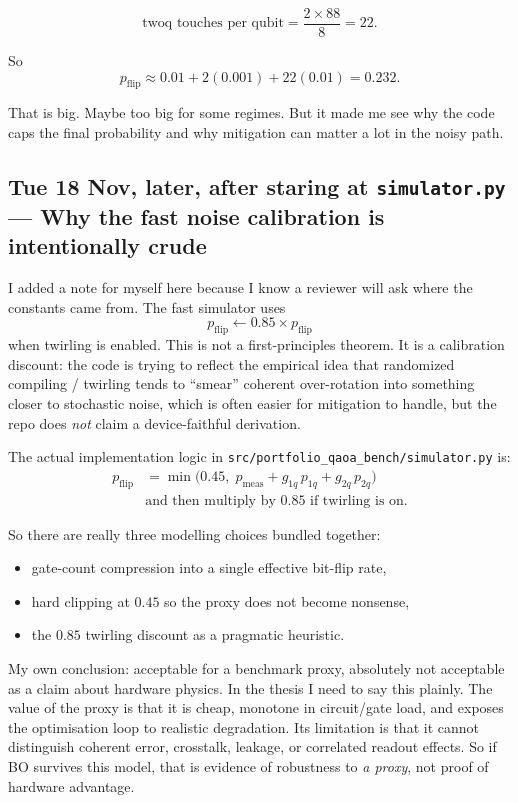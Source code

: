 \documentclass[11pt]{article}
\newcommand{\entry}[2]{\subsection*{#1 --- #2}}
\newcommand{\repo}[1]{\texttt{#1}}
\begin{document}
\[
\text{twoq touches per qubit}
=
\frac{2 \times 88}{8} = 22.
\]

So
\[
p_{\text{flip}} \approx 0.01 + 2(0.001) + 22(0.01) = 0.232.
\]

That is big. Maybe too big for some regimes. But it made me see why the code caps the final
probability and why mitigation can matter a lot in the noisy path.

\entry{Tue 18 Nov, later, after staring at \repo{simulator.py}}{Why the fast noise calibration is intentionally crude}

I added a note for myself here because I know a reviewer will ask where the constants came from.
The fast simulator uses
\[
p_{\text{flip}} \leftarrow 0.85 \times p_{\text{flip}}
\]
when twirling is enabled. This is not a first-principles theorem. It is a calibration discount:
the code is trying to reflect the empirical idea that randomized compiling / twirling tends to
``smear'' coherent over-rotation into something closer to stochastic noise, which is often easier
for mitigation to handle, but the repo does \emph{not} claim a device-faithful derivation.

The actual implementation logic in \repo{src/portfolio\_qaoa\_bench/simulator.py} is:
\begin{align*}
p_{\text{flip}}
&=
\min\Big(
0.45,\;
p_{\text{meas}}
+ g_{1q}\,p_{1q}
+ g_{2q}\,p_{2q}
\Big) \\
&\text{and then multiply by }0.85\text{ if twirling is on.}
\end{align*}

So there are really three modelling choices bundled together:
\begin{itemize}[leftmargin=1.4em]
\item gate-count compression into a single effective bit-flip rate,
\item hard clipping at \(0.45\) so the proxy does not become nonsense,
\item the \(0.85\) twirling discount as a pragmatic heuristic.
\end{itemize}

My own conclusion: acceptable for a benchmark proxy, absolutely not acceptable as a claim about
hardware physics. In the thesis I need to say this plainly. The value of the proxy is that it is
cheap, monotone in circuit/gate load, and exposes the optimisation loop to realistic degradation.
Its limitation is that it cannot distinguish coherent error, crosstalk, leakage, or correlated
readout effects. So if BO survives this model, that is evidence of robustness to \emph{a proxy},
not proof of hardware advantage.
\end{document}
